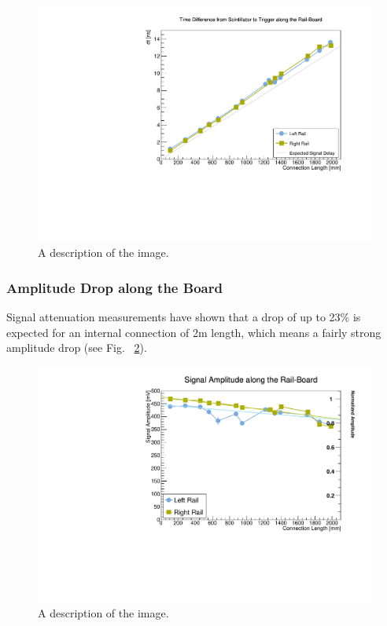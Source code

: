 \documentclass[../BTOF_summary.tex]{subfiles}
\begin{document}
\begin{figure}[h!]
    \centering
    \includegraphics[scale=0.5]{Pictures/TimeDiff_toTrigger.pdf}
    \caption{A description of the image.}
    \label{fig:DiffTr}
\end{figure}

\subsubsection{Amplitude Drop along the Board}
Signal attenuation measurements have shown that a drop of up to 23\% is expected for an internal connection of 2m length, which means a fairly strong amplitude drop (see Fig. ~\ref{fig:SA}).

\begin{figure}[h!]
    \centering
    \includegraphics[scale=0.5]{Pictures/SignalAmplitude.pdf}
    \caption{A description of the image.}
    \label{fig:SA}
\end{figure}
\end{document}
